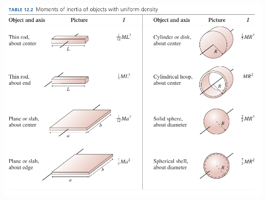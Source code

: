\documentclass[12pt]{article}
\begin{document}
\newpage


\begin{center}
\includegraphics[width=7in]{moment-table.png}
\end{center}
\end{document}

